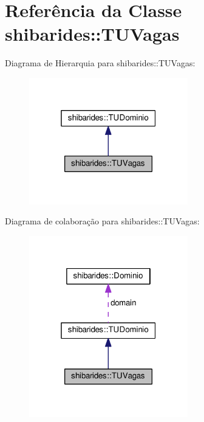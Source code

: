 \hypertarget{classshibarides_1_1TUVagas}{}\section{Referência da Classe shibarides\+:\+:T\+U\+Vagas}
\label{classshibarides_1_1TUVagas}


Diagrama de Hierarquia para shibarides\+:\+:T\+U\+Vagas\+:\nopagebreak
\begin{figure}[H]
\begin{center}
\leavevmode
\includegraphics[width=196pt]{classshibarides_1_1TUVagas__inherit__graph}
\end{center}
\end{figure}


Diagrama de colaboração para shibarides\+:\+:T\+U\+Vagas\+:\nopagebreak
\begin{figure}[H]
\begin{center}
\leavevmode
\includegraphics[width=196pt]{classshibarides_1_1TUVagas__coll__graph}
\end{center}
\end{figure}
